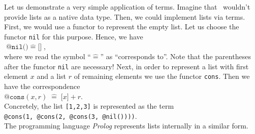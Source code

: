 Let us demonstrate a very simple application of terms.  Imagine that \setlx\ wouldn't provide lists as a native data
type.  Then, we could implement lists via terms.  First, we would use a functor to represent the empty list.
Let us choose the functor \texttt{nil} for this purpose.  Hence, we have
\\[0.2cm]
\hspace*{1.3cm}
$\texttt{@nil()} \;\widehat{=}\; \texttt{[]}$,
\\[0.2cm]
where we read the symbol ``$\widehat{=}$'' as ``corresponds to''.
Note that the parentheses after the functor  \texttt{nil} are \colorbox{amethyst}{necessary!}  Next, in order to represent
a list with first element $x$ and a list $r$ of remaining elements we use the functor \texttt{cons}.
Then we have the correspondence
\\[0.2cm]
\hspace*{1.3cm}
$\texttt{@cons}(x, r) \;\widehat{=}\; \texttt{[}x\texttt{]} + r$. 
\\[0.2cm]
Concretely, the list \texttt{[1,2,3]} is represented as the term
\\[0.2cm]
\hspace*{1.3cm}
\texttt{@cons(1, @cons(2, @cons(3, @nil())))}.
\\[0.2cm]
The programming language \textsl{Prolog} represents lists internally in a similar form.

